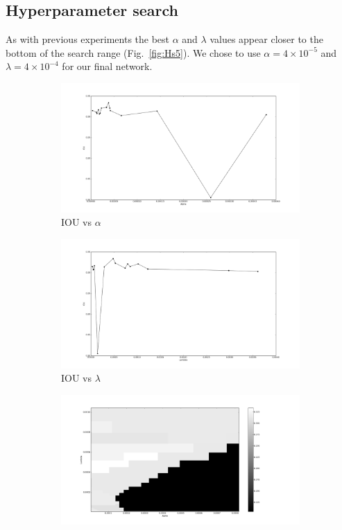 \subsection{Hyperparameter search}
As with previous experiments the best $\alpha$ and $\lambda$ values appear closer to the bottom of the search range (Fig.~\ref{fig:Hs5}). We chose to use $\alpha = 4 \times 10^{-5}$ and $\lambda = 4 \times 10^{-4}$ for our final network.
\begin{figure}[h]
	\centering
	\begin{subfigure}{0.32\textwidth}
		\centering
                \includegraphics[width=\textwidth]{plots/hs5_alpha.png}
         \caption{IOU vs $\alpha$}
	\end{subfigure}
	\begin{subfigure}{0.32\textwidth}
		\centering
                \includegraphics[width=\textwidth]{plots/hs5_lambda.png}
         \caption{IOU vs $\lambda$}
	\end{subfigure}
	\begin{subfigure}{0.32\textwidth}
		\centering
                \includegraphics[width=\textwidth]{plots/hs5_pcolor.png}

\end{subfigure}
\end{figure}
